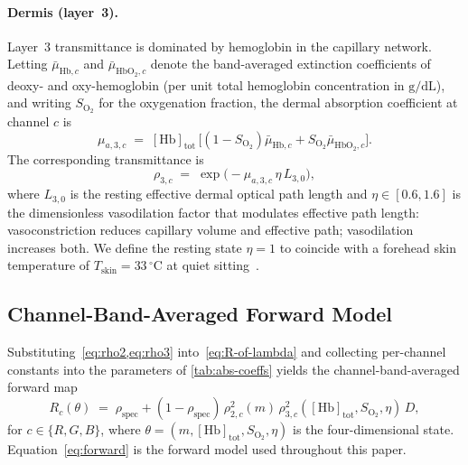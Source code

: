 \documentclass[10pt,twocolumn,a4paper]{article}
\theoremstyle{definition}
\newcommand{\Hb}{\mathrm{Hb}}
\newcommand{\HbO}{\mathrm{HbO_2}}
\newcommand{\Tskin}{T_{\mathrm{skin}}}
\newcommand{\vaso}{\eta}
\newcommand{\melan}{m}
\newcommand{\Hbconc}{[\Hb]_{\mathrm{tot}}}
\newcommand{\Soxy}{S_{\mathrm{O_2}}}
\begin{document}
\paragraph{Dermis (layer~3).} Layer~3 transmittance is dominated by
hemoglobin in the capillary network. Letting $\bar{\mu}_{\Hb,c}$ and
$\bar{\mu}_{\HbO,c}$ denote the band-averaged extinction coefficients
of deoxy- and oxy-hemoglobin (per unit total hemoglobin concentration
in $\mathrm{g/dL}$), and writing $\Soxy$ for the oxygenation fraction,
the dermal absorption coefficient at channel $c$ is
\begin{equation}
    \mu_{a,3,c}
    \;=\; \Hbconc\,\bigl[(1-\Soxy)\bar{\mu}_{\Hb,c} + \Soxy\bar{\mu}_{\HbO,c}\bigr].
    \label{eq:mu-derm}
\end{equation}
The corresponding transmittance is
\begin{equation}
    \rho_{3,c}
    \;=\; \exp\bigl(-\mu_{a,3,c}\, \vaso\, L_{3,0}\bigr),
    \label{eq:rho3}
\end{equation}
where $L_{3,0}$ is the resting effective dermal optical path length
and $\vaso\in[0.6,1.6]$ is the dimensionless vasodilation factor that
modulates effective path length: vasoconstriction reduces capillary
volume and effective path; vasodilation increases both. We define
the resting state $\vaso=1$ to coincide with a forehead skin
temperature of $\Tskin=33\,^{\circ}\mathrm{C}$ at quiet
sitting~\cite{webb1992,kelechava2014}.

\subsection{Channel-Band-Averaged Forward Model}

Substituting~\cref{eq:rho2,eq:rho3} into~\cref{eq:R-of-lambda} and
collecting per-channel constants into the parameters of
\cref{tab:abs-coeffs} yields the channel-band-averaged forward map
\begin{equation}
    \boxed{\;
    R_{c}(\theta)
    \;=\; \rho_{\mathrm{spec}}
    + (1 - \rho_{\mathrm{spec}})\,
      \rho_{2,c}^{2}(\melan)\,
      \rho_{3,c}^{2}(\Hbconc,\Soxy,\vaso)\,
      D,
    \;}
    \label{eq:forward}
\end{equation}
for $c\in\{R,G,B\}$, where $\theta=(\melan,\Hbconc,\Soxy,\vaso)$ is
the four-dimensional state. Equation~\eqref{eq:forward} is the forward
model used throughout this paper.
\end{document}
